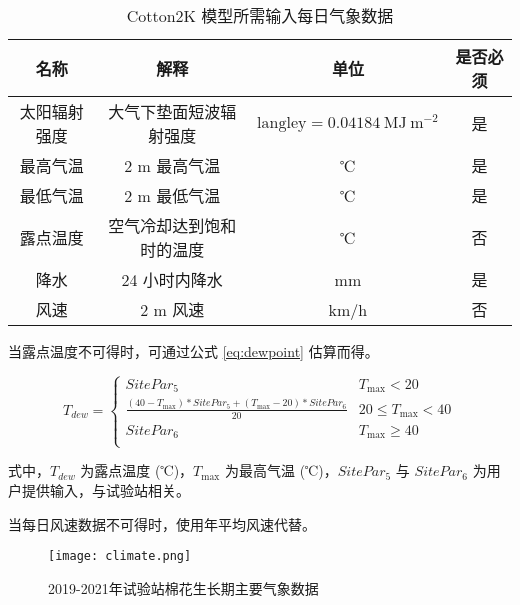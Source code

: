 \begin{table}
    \caption{Cotton2K 模型所需输入每日气象数据}\label{tab:meteorology}
    \small
    \centering
    \begin{tabular}{cccc}
        \toprule
        名称         & 解释                     & 单位                                              & 是否必须 \\
        \midrule
        太阳辐射强度 & 大气下垫面短波辐射强度   & $\mathrm{langley} = 0.04184\ \mathrm{MJ\ m^{-2}}$ & 是       \\
        最高气温     & 2 m 最高气温             & ℃                                                 & 是       \\
        最低气温     & 2 m 最低气温             & ℃                                                 & 是       \\
        露点温度     & 空气冷却达到饱和时的温度 & ℃                                                 & 否       \\
        降水         & 24 小时内降水            & mm                                                & 是       \\
        风速         & 2 m 风速                 & km/h                                              & 否       \\
        \bottomrule
    \end{tabular}
\end{table}

当露点温度不可得时，可通过公式 \ref{eq:dewpoint} 估算而得。

\begin{equation}\label{eq:dewpoint}
    T_{dew} = \begin{cases}
        SitePar_5                                                            & T_{\max} < 20        \\
        \frac{(40 - T_{\max}) * SitePar_5 + (T_{\max} - 20) * SitePar_6}{20} & 20 \le T_{\max} < 40 \\
        SitePar_6                                                            & T_{\max} \ge 40      \\
    \end{cases}
\end{equation}

式中，$T_{dew}$ 为露点温度 (℃)，$T_{\max}$ 为最高气温 (℃)，$SitePar_5$ 与 $SitePar_6$ 为用户提供输入，与试验站相关。

当每日风速数据不可得时，使用年平均风速代替。

\begin{figure}
    \centering
    \texttt{[image: climate.png]}
    \caption{2019-2021年试验站棉花生长期主要气象数据}
\end{figure}

